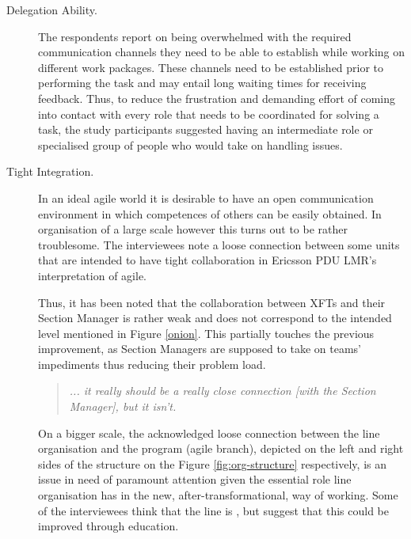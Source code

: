 \begin{description}

   \item[Delegation Ability.] The respondents report on being overwhelmed with the required communication channels they need to be able to establish while working on different work packages. These channels need to be established prior to performing the task and may entail long waiting times for receiving feedback. Thus, to reduce the frustration and demanding effort of coming into contact with every role that needs to be coordinated for solving a task, the study participants suggested having an intermediate role or specialised group of people who would take on handling issues.
   

   \item[Tight Integration.] In an ideal agile world it is desirable to have an open communication environment in which competences of others can be easily obtained. In organisation of a large scale however this turns out to be rather troublesome. The interviewees note a loose connection between some units that are intended to have tight collaboration in Ericsson PDU LMR's interpretation of agile. 
   
   Thus, it has been noted that the collaboration between \acp{XFT} and their Section Manager is rather weak and does not correspond to the intended level mentioned in Figure \ref{onion}. This partially touches the previous improvement, as Section Managers are supposed to take on teams' impediments thus reducing their problem load.
   
   \begin{quote}\itshape
   ... it really should be a really close connection [with the Section Manager], but it isn’t.
   \end{quote}
   
   On a bigger scale, the acknowledged loose connection between the line organisation and the program (agile branch), depicted on the left and right sides of the structure on the Figure \ref{fig:org-structure} respectively, is an issue in need of paramount attention given the essential role line organisation has in the new, after-transformational, way of working. Some of the interviewees think that the line is , but suggest that this could be improved through education.
   

\end{description}
